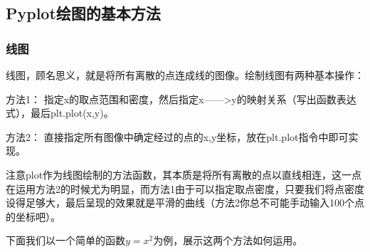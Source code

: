 \documentclass[12pt]{article}
\begin{document}
\subsection{Pyplot绘图的基本方法}
\subsubsection{线图}
线图，顾名思义，就是将所有离散的点连成线的图像。绘制线图有两种基本操作：

方法1： 指定x的取点范围和密度，然后指定x——>y的映射关系（写出函数表达式），最后plt.plot(x,y)。

方法2： 直接指定所有图像中确定经过的点的x,y坐标，放在plt.plot指令中即可实现。

注意plot作为线图绘制的方法函数，其本质是将所有离散的点以直线相连，这一点在运用方法2的时候尤为明显，而方法1由于可以指定取点密度，只要我们将点密度设得足够大，最后呈现的效果就是平滑的曲线（方法2你总不可能手动输入100个点的坐标吧）。

下面我们以一个简单的函数\(y=x^2\)为例，展示这两个方法如何运用。
\end{document}
